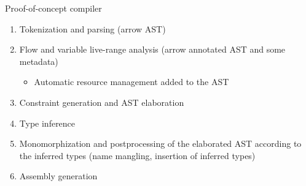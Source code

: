 \documentclass[aspectratio=169]{beamer}
\newcommand{\xxx}[1]{\textcolor{red!}{#1}}
\begin{document}
\begin{frame}{Proof-of-concept compiler}
  \begin{enumerate}
    \item Tokenization and parsing (\xxx{arrow} AST)
    \item Flow and variable live-range analysis (\xxx{arrow} annotated AST and \xxx{some metadata})
    \begin{itemize}
      \color{olive}
      \item Automatic resource management added to the AST
    \end{itemize}
    \item Constraint generation and AST elaboration
    \item Type inference
    \item Monomorphization and postprocessing of the elaborated AST according to the inferred types (name mangling, insertion of inferred types)
    \item Assembly generation
  \end{enumerate}
\end{frame}
\end{document}
